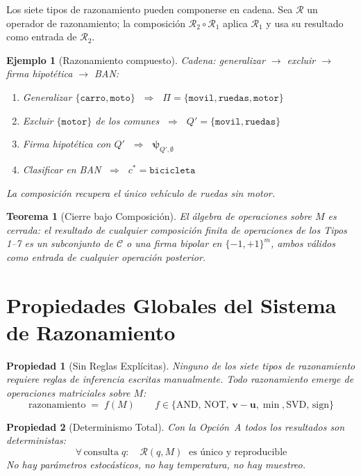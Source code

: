 \documentclass[12pt]{article}
\newtheorem{theorem}{Teorema}[section]
\newtheorem{property}{Propiedad}[section]
\newtheorem{example}{Ejemplo}[section]
\begin{document}
Los siete tipos de razonamiento pueden componerse en cadena.
Sea $\mathcal{R}$ un operador de razonamiento; la composición
$\mathcal{R}_2 \circ \mathcal{R}_1$ aplica $\mathcal{R}_1$ y usa
su resultado como entrada de $\mathcal{R}_2$.

\begin{example}[Razonamiento compuesto]
	Cadena: generalizar $\to$ excluir $\to$ firma hipotética $\to$ BAN:
	\begin{enumerate}[leftmargin=*]
		\item Generalizar $\{\texttt{carro},\texttt{moto}\}$
		$\;\Rightarrow\;$ $\Pi = \{\texttt{movil},\texttt{ruedas},\texttt{motor}\}$
		\item Excluir $\{\texttt{motor}\}$ de los comunes
		$\;\Rightarrow\;$ $Q' = \{\texttt{movil},\texttt{ruedas}\}$
		\item Firma hipotética con $Q'$
		$\;\Rightarrow\;$ $\bm{\psi}_{Q',\emptyset}$
		\item Clasificar en BAN
		$\;\Rightarrow\;$ $c^* = \texttt{bicicleta}$ \quad\checkmark
	\end{enumerate}
	La composición recupera el único vehículo de ruedas sin motor.
\end{example}

\begin{theorem}[Cierre bajo Composición]
	El álgebra de operaciones sobre $M$ es cerrada: el resultado de cualquier
	composición finita de operaciones de los Tipos 1–7 es un subconjunto de
	$\mathcal{C}$ o una firma bipolar en $\{-1,+1\}^m$, ambos válidos como
	entrada de cualquier operación posterior.
\end{theorem}

\section{Propiedades Globales del Sistema de Razonamiento}

\begin{property}[Sin Reglas Explícitas]
	Ninguno de los siete tipos de razonamiento requiere reglas de inferencia
	escritas manualmente. Todo razonamiento emerge de operaciones matriciales
	sobre $M$:
	\[
	\text{razonamiento} \;=\; f(M) \qquad f \in \{\text{AND, NOT, }\mathbf{v}-\mathbf{u},
	\min, \text{SVD, sign}\}
	\]
\end{property}

\begin{property}[Determinismo Total]
	Con la Opción~A todos los resultados son deterministas:
	\[
	\forall\,\text{consulta}\; q:\quad
	\mathcal{R}(q, M) \;\text{ es único y reproducible}
	\]
	No hay parámetros estocásticos, no hay temperatura, no hay muestreo.
\end{property}
\end{document}
